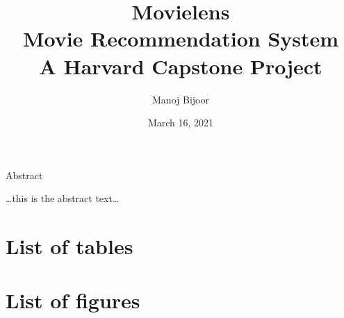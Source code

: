 \documentclass[
]{article}
\title{Movielens\\
Movie Recommendation System\\
A Harvard Capstone Project}
\author{Manoj Bijoor}
\date{March 16, 2021}
\begin{document}
\maketitle



\newpage

\newpage

\begin{center}

\hypertarget{Abstract}{}
\large{Abstract}

\end{center}

\bigskip

\ldots this is the abstract text\ldots{}

\newpage 
\clearpage
{}
\setcounter{secnumdepth}{5}
\setcounter{tocdepth}{5}

\cleardoublepage  \hypertarget{toc}{}
\bookmark[dest=toc,level=chapter]{\contentsname} \tableofcontents

\clearpage

\newpage
\clearpage
{}

\hypertarget{list-of-tables}{%
\section*{List of tables}\label{list-of-tables}}

\renewcommand{\listtablename}{}

\listoftables
\clearpage

\newpage
\clearpage
{}

\hypertarget{list-of-figures}{%
\section*{List of figures}\label{list-of-figures}}

\renewcommand{\listfigurename}{}

\listoffigures
\clearpage

\newpage
\clearpage
{}
\newcommand{\listequationsname}{List of Equations}
\newcommand{\equations}[1]{%
\refstepcounter{equations}
\addcontentsline{equ}{equations}{ \protect\numberline{\theequations}#1}\par}
\end{document}
